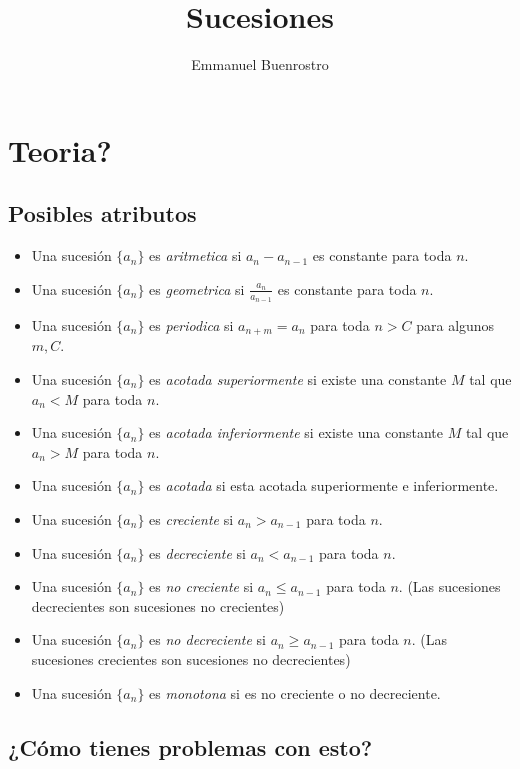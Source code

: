 \documentclass[11pt]{scrartcl}
\title {Sucesiones}
\author{Emmanuel Buenrostro}
\begin{document}
\maketitle

\section{Teoria?}


\subsection{Posibles atributos}
\begin{itemize}
\item Una sucesi\'on $\{a_n\}$ es \textit{aritmetica} si $a_n-a_{n-1}$ es constante para toda $n$.
\item Una sucesi\'on $\{a_n\}$ es \textit{geometrica} si $\frac{a_n}{a_{n-1}}$ es constante para toda $n$.
\item Una sucesi\'on $\{a_n\}$ es \textit{periodica} si $a_{n+m}=a_n$ para toda $n>C$ para algunos $m,C$.
\item Una sucesi\'on $\{a_n\}$ es \textit{acotada superiormente} si existe una constante $M$ tal que $a_n < M$ para toda $n$.
\item Una sucesi\'on $\{a_n\}$ es \textit{acotada inferiormente} si existe una constante $M$ tal que $a_n > M$ para toda $n$.
\item Una sucesi\'on $\{a_n\}$ es \textit{acotada} si esta acotada superiormente e inferiormente.
\item Una sucesi\'on $\{a_n\}$ es \textit{creciente} si $a_n>a_{n-1}$ para toda $n$.
\item Una sucesi\'on $\{a_n\}$ es \textit{decreciente} si $a_n < a_{n-1}$ para toda $n$.
\item Una sucesi\'on $\{a_n\}$ es \textit{no creciente} si $a_n \leq a_{n-1}$ para toda $n$. (Las sucesiones decrecientes son sucesiones no crecientes)
\item Una sucesi\'on $\{a_n\}$ es \textit{no decreciente} si $a_n \geq a_{n-1}$ para toda $n$. (Las sucesiones crecientes son sucesiones no decrecientes)
\item Una sucesi\'on $\{a_n\}$ es \textit{monotona} si es no creciente o no decreciente.
\end{itemize}


\subsection{¿C\'omo tienes problemas con esto?}
\end{document}
